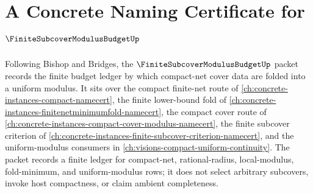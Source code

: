 \chapter{A Concrete Naming Certificate for $\FiniteSubcoverModulusBudgetUp$}
\label{ch:concrete-instances-finite-subcover-modulus-budget-namecert}

Following Bishop and Bridges, the $\FiniteSubcoverModulusBudgetUp$ packet records the finite budget ledger by which compact-net cover data are folded into a uniform modulus. It sits over the compact finite-net route of \autoref{ch:concrete-instances-compact-namecert}, the finite lower-bound fold of \autoref{ch:concrete-instances-finitenetminimumfold-namecert}, the compact cover route of \autoref{ch:concrete-instances-compact-cover-modulus-namecert}, the finite subcover criterion of \autoref{ch:concrete-instances-finite-subcover-criterion-namecert}, and the uniform-modulus consumers in \autoref{ch:visions-compact-uniform-continuity}. The packet records a finite ledger for compact-net, rational-radius, local-modulus, fold-minimum, and uniform-modulus rows; it does not select arbitrary subcovers, invoke host compactness, or claim ambient completeness.

